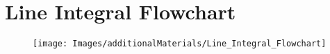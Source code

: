 \section{Line Integral Flowchart}

\begin{figure}[H]
	\centering
	\hspace*{-1.5in}
	\texttt{[image: Images/additionalMaterials/Line\_Integral\_Flowchart]}
\end{figure}

\pagebreak